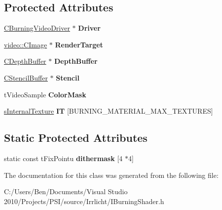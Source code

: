 \subsection*{Protected Attributes}
\begin{DoxyCompactItemize}
\item 
\hypertarget{classirr_1_1video_1_1_i_burning_shader_a1547533f04ef3525aade210b31b046fb}{\hyperlink{classirr_1_1video_1_1_c_burning_video_driver}{C\-Burning\-Video\-Driver} $\ast$ {\bfseries Driver}}\label{classirr_1_1video_1_1_i_burning_shader_a1547533f04ef3525aade210b31b046fb}

\item 
\hypertarget{classirr_1_1video_1_1_i_burning_shader_a0d0efdabccc99e61a81d52f70cc3653c}{\hyperlink{classirr_1_1video_1_1_c_image}{video\-::\-C\-Image} $\ast$ {\bfseries Render\-Target}}\label{classirr_1_1video_1_1_i_burning_shader_a0d0efdabccc99e61a81d52f70cc3653c}

\item 
\hypertarget{classirr_1_1video_1_1_i_burning_shader_a85b9795c04c17365095eb892ddf25089}{\hyperlink{classirr_1_1video_1_1_c_depth_buffer}{C\-Depth\-Buffer} $\ast$ {\bfseries Depth\-Buffer}}\label{classirr_1_1video_1_1_i_burning_shader_a85b9795c04c17365095eb892ddf25089}

\item 
\hypertarget{classirr_1_1video_1_1_i_burning_shader_a7a98ce32975aa0567f415b7a891cf0d3}{\hyperlink{classirr_1_1video_1_1_c_stencil_buffer}{C\-Stencil\-Buffer} $\ast$ {\bfseries Stencil}}\label{classirr_1_1video_1_1_i_burning_shader_a7a98ce32975aa0567f415b7a891cf0d3}

\item 
\hypertarget{classirr_1_1video_1_1_i_burning_shader_a8c6ad143917666ad69215310bfbf9b8f}{t\-Video\-Sample {\bfseries Color\-Mask}}\label{classirr_1_1video_1_1_i_burning_shader_a8c6ad143917666ad69215310bfbf9b8f}

\item 
\hypertarget{classirr_1_1video_1_1_i_burning_shader_a1d72624b35ff8a47d317cf493b0ae6bf}{\hyperlink{structirr_1_1s_internal_texture}{s\-Internal\-Texture} {\bfseries I\-T} \mbox{[}B\-U\-R\-N\-I\-N\-G\-\_\-\-M\-A\-T\-E\-R\-I\-A\-L\-\_\-\-M\-A\-X\-\_\-\-T\-E\-X\-T\-U\-R\-E\-S\mbox{]}}\label{classirr_1_1video_1_1_i_burning_shader_a1d72624b35ff8a47d317cf493b0ae6bf}

\end{DoxyCompactItemize}
\subsection*{Static Protected Attributes}
\begin{DoxyCompactItemize}
\item 
\hypertarget{classirr_1_1video_1_1_i_burning_shader_a603b66897a4a5ecb52480b86dcbba9c4}{static const t\-Fix\-Pointu {\bfseries dithermask} \mbox{[}4 $\ast$4\mbox{]}}\label{classirr_1_1video_1_1_i_burning_shader_a603b66897a4a5ecb52480b86dcbba9c4}

\end{DoxyCompactItemize}


The documentation for this class was generated from the following file\-:\begin{DoxyCompactItemize}
\item 
C\-:/\-Users/\-Ben/\-Documents/\-Visual Studio 2010/\-Projects/\-P\-S\-I/source/\-Irrlicht/I\-Burning\-Shader.\-h\end{DoxyCompactItemize}
